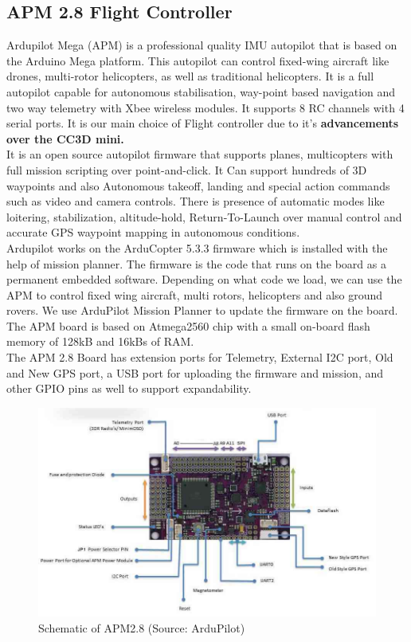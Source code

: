 \subsection{APM 2.8 Flight Controller}
Ardupilot Mega (APM) is a professional quality IMU autopilot that is based on the Arduino Mega platform.  This autopilot can control fixed-wing aircraft like drones, multi-rotor helicopters, as well as traditional helicopters.  It is a full autopilot capable for autonomous stabilisation, way-point based navigation and two way telemetry with Xbee wireless modules. It supports 8 RC channels with 4 serial ports. It is our main choice of Flight controller due to it's \textbf{advancements over the CC3D mini.}
\\
It is an open source autopilot firmware that supports planes, multicopters with full mission scripting over point-and-click. It Can support hundreds of 3D waypoints and also Autonomous takeoff, landing and special action commands such as video and camera controls. There is presence of automatic modes like loitering, stabilization, altitude-hold, Return-To-Launch over manual control and accurate GPS waypoint mapping in autonomous conditions.
\\
Ardupilot works on the ArduCopter 5.3.3 firmware which is installed with the help of mission planner. The firmware is the code that runs on the board as a permanent embedded software. Depending on what code we load, we can use the APM to control fixed wing aircraft, multi rotors, helicopters and also ground rovers. We use ArduPilot Mission Planner to update the firmware on the board. The APM board is based on Atmega2560 chip with a small on-board flash memory of 128kB and 16kBs of RAM.
\\ 
The APM 2.8 Board has extension ports for Telemetry, External I2C port, Old and New GPS port, a USB port for uploading the firmware and mission, and other GPIO pins as well to support expandability.

\begin{figure}[H]
    \centering
    \includegraphics[scale=0.7]{SummerInterReport/project/Images-Major/apm.jpg}
    \caption{Schematic of APM2.8 (Source: ArduPilot)}
    \label{fig:apm}
\end{figure}
